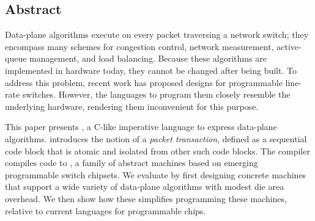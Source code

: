 \subsection*{Abstract}
Data-plane algorithms execute on every packet traversing a network switch; they
encompass many schemes for congestion control, network measurement,
active-queue management, and load balancing. Because these algorithms are
implemented in hardware today, they cannot be changed after being built. To
address this problem, recent work has proposed designs for programmable
line-rate switches.  However, the languages to program them closely resemble
the underlying hardware, rendering them inconvenient for this purpose.

This paper presents \pktlanguage, a C-like imperative language to express
data-plane algorithms. \pktlanguage introduces the notion of a {\em packet
transaction}, defined as a sequential code block that is atomic and isolated
from other such code blocks.  The \pktlanguage compiler compiles \pktlanguage
code to \absmachine, a family of abstract machines based on emerging
programmable switch chipsets. We evaluate \pktlanguage by first designing
concrete \absmachine machines that support a wide variety of data-plane
algorithms with modest die area overhead. We then show how these \pktlanguage
simplifies programming these machines, relative to current languages for
programmable chips.

